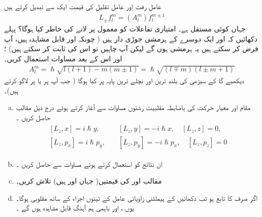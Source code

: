 عامل رفت اور عامل تقلیل  کی قیمت ایک  سے تبدیل کرتے ہیں 
\begin{align}\label{مساوات_تین_ابعاد_عامل_تقلیل_رفعت_اکائی_تبدیلی}
L_{\pm} f_l^m = (A_l^m) f_l^{m \pm 1}
\end{align}
جہاں  کوئی مستقل ہے۔  امتیازی تفاعلات کو معمول پر لانے کی خاطر  کیا ہوگا؟   پہلے دکھائیں کہ  اور  ایک دوسرے کے ہرمشی جوڑی دار ہیں ( چونکہ  اور  قابل مشاہدہ  ہیں،  آپ فرض کر سکتے ہیں یہ ہرمشی ہوں گے لیکن آپ چاہیں تو اس کی ثابت کر سکتے ہیں) ؛ اور   اس کے بعد مساوات    استعمال کریں۔  
\begin{align}\label{مساوات_تین_ابعادی_اے_ایل_ایم}
A_l^m = \hslash \sqrt{l (l +1) - m (m \pm 1)} = \hslash \sqrt{(l \mp m)(l \pm m + 1)} 
\end{align}
دیکھیے گا کے سیڑھی کی بلند ترین اور نچلے ترین پایہ پر کیا ہوگا ( جب آپ  پر  یا  پر  لاگو کرتے ہیں)۔ 
\begin{enumerate}[a.]
\item
مقام اور معیار حرکت کی باضابطہ  مقلبیت رشتوں   مساوات    سے آغاز  کرتے ہوئے درج ذیل مقالب  حاصل کریں ۔
\begin{gather}
\begin{aligned}
[L_z , x] = i \hslash y, & \quad [L_z , y] = - i \hslash x, \quad  [L_z , z] = 0, \\
 [L_z , p_x] = i \hslash p_y ,   &\quad [L_z , p_y] = - i \hslash p_x , \quad [L_z , p_z] = 0
\end{aligned}
\end{gather}
\item
ان نتائج کو استعمال کرتے ہوئے مساوات    سے   حاصل کریں ۔
\item
مقالب   اور  کی قیمتیں( جہاں  اور  ہیں)  تلاش کریں۔
\item
اگر  صرف  کا تابع ہو تب دکھائیں کے ہیملٹنی  زاویائی عامل   کے  تینوں اجزاء کے ساتھ مقلوبی  ہوگا۔ یوں ،   اور  باہمی ہم آہنگ  قابل مشاہدہ  ہوں گے ۔
\end{enumerate}
